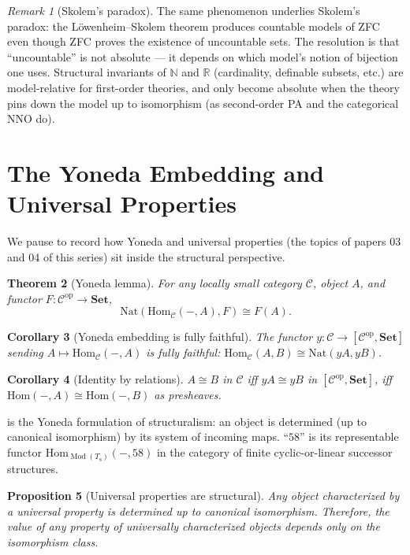 \documentclass[12pt]{article}
\newtheorem{theorem}{Theorem}[section]
\newtheorem{proposition}[theorem]{Proposition}
\newtheorem{corollary}[theorem]{Corollary}
\theoremstyle{definition}
\theoremstyle{remark}
\newtheorem{remark}[theorem]{Remark}
\newcommand{\Set}{\mathbf{Set}}
\newcommand{\op}{\mathrm{op}}
\newcommand{\Hom}{\mathrm{Hom}}
\newcommand{\Nat}{\mathrm{Nat}}
\newcommand{\NN}{\mathbb{N}}
\newcommand{\RR}{\mathbb{R}}
\newcommand{\C}{\mathcal{C}}
\newcommand{\Mod}[1]{\operatorname{Mod}(#1)}
\newcommand{\iso}{\cong}
\newcommand{\succop}{\mathrm{s}}
\begin{document}
\begin{remark}[Skolem's paradox]
The same phenomenon underlies Skolem's paradox: the L\"owenheim--Skolem theorem produces countable models of ZFC even though ZFC proves the existence of uncountable sets. The resolution is that ``uncountable'' is not absolute --- it depends on which model's notion of bijection one uses. Structural invariants of $\NN$ and $\RR$ (cardinality, definable subsets, etc.) are model-relative for first-order theories, and only become absolute when the theory pins down the model up to isomorphism (as second-order PA and the categorical NNO do).
\end{remark}

\section{The Yoneda Embedding and Universal Properties}\label{sec:yoneda}

We pause to record how Yoneda and universal properties (the topics of papers 03 and 04 of this series) sit inside the structural perspective.

\begin{theorem}[Yoneda lemma]
For any locally small category $\C$, object $A$, and functor $F : \C^\op \to \Set$,
\[
  \Nat(\Hom_\C(-, A), F) \iso F(A).
\]
\end{theorem}

\begin{corollary}[Yoneda embedding is fully faithful]
The functor $y : \C \to [\C^\op, \Set]$ sending $A \mapsto \Hom_\C(-, A)$ is fully faithful: $\Hom_\C(A, B) \iso \Nat(yA, yB)$.
\end{corollary}

\begin{corollary}[Identity by relations]\label{cor:id-by-rel}
$A \iso B$ in $\C$ iff $yA \iso yB$ in $[\C^\op, \Set]$, iff $\Hom(-, A) \iso \Hom(-, B)$ as presheaves.
\end{corollary}

 is the Yoneda formulation of structuralism: an object is determined (up to canonical isomorphism) by its system of incoming maps. ``$58$'' is its representable functor $\Hom_{\Mod{T_\succop}}(-, 58)$ in the category of finite cyclic-or-linear successor structures.

\begin{proposition}[Universal properties are structural]
Any object characterized by a universal property is determined up to canonical isomorphism. Therefore, the value of any property of universally characterized objects depends only on the isomorphism class.
\end{proposition}
\end{document}

